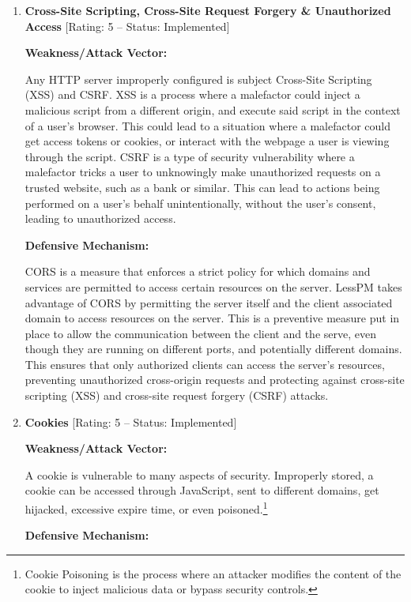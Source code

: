 \begin{enumerate}[label=$\blacktriangleright$]
  \item \textbf{
    Cross-Site Scripting,
    Cross-Site Request Forgery
    \& Unauthorized Access} [Rating: 5 -- Status: Implemented]

  \textbf{Weakness/Attack Vector:}

  Any HTTP server improperly configured is subject Cross-Site Scripting (XSS)
  and CSRF\@.
  XSS is a process where a malefactor could inject a malicious script from a
  different origin, and execute said script in the context of a user's browser.
  This could lead to a situation where a malefactor could get access tokens
  or cookies, or interact with the webpage a user is viewing through the
  script.
  CSRF is a type of security vulnerability where a malefactor tricks a user
  to unknowingly make unauthorized requests on a trusted website, such as a
  bank or similar.
  This can lead to actions being performed on a user's behalf unintentionally,
  without the user's consent, leading to unauthorized access.

  \textbf{Defensive Mechanism:}

  CORS is a measure that enforces a strict policy for which domains and services
  are permitted to access certain resources on the server.
  LessPM takes advantage of CORS by permitting the server itself and the
  client associated domain to access resources on the server.
  This is a preventive measure put in place to allow the communication
  between the client and the serve, even though they are running on different
  ports, and potentially different domains.
  This ensures that only authorized clients can access the server's resources,
  preventing unauthorized cross-origin requests and protecting against
  cross-site scripting (XSS) and cross-site request forgery (CSRF) attacks.

  \item \textbf{Cookies} [Rating: 5 -- Status: Implemented]

  \textbf{Weakness/Attack Vector:}

  A cookie is vulnerable to many aspects of security.
  Improperly stored, a cookie can be accessed through JavaScript, sent to
  different domains, get hijacked, excessive expire time, or even poisoned.\footnote{
    Cookie Poisoning is the process where an attacker modifies the content of
    the cookie to inject malicious data or bypass security controls.
  }

  \textbf{Defensive Mechanism:}


\end{enumerate}
